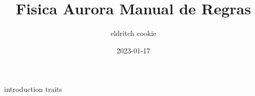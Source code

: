 \documentclass{book}
\title{Fisica Aurora Manual de Regras}
\date{2023-01-17}
\author{eldritch cookie}
\begin{document}
  \maketitle
  \newpage
  \tableofcontents
  {introduction}
  {traits}
\end{document}
